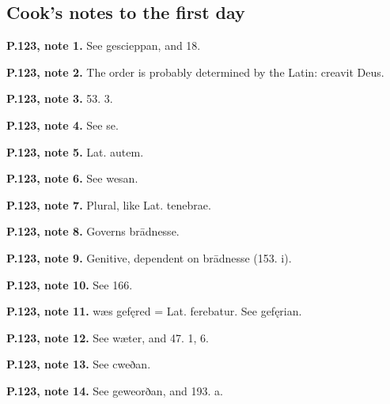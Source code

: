 \subsection*{Cook’s notes to the first day}

\textbf{P.123, note 1.} See gescieppan, and 18.

\textbf{P.123, note 2.} The order is probably determined by the Latin: creavit Deus.

\textbf{P.123, note 3.} 53. 3.

\textbf{P.123, note 4.} See se.

\textbf{P.123, note 5.} Lat. autem.

\textbf{P.123, note 6.} See wesan.

\textbf{P.123, note 7.} Plural, like Lat. tenebrae.

\textbf{P.123, note 8.} Governs brādnesse.

\textbf{P.123, note 9.} Genitive, dependent on brādnesse (153. i).

\textbf{P.123, note 10.} See 166.

\textbf{P.123, note 11.} wæs gefęred = Lat. ferebatur. See gefęrian.

\textbf{P.123, note 12.} See wæter, and 47. 1, 6.

\textbf{P.123, note 13.} See cweðan.

\textbf{P.123, note 14.} See geweorðan, and 193. a.

